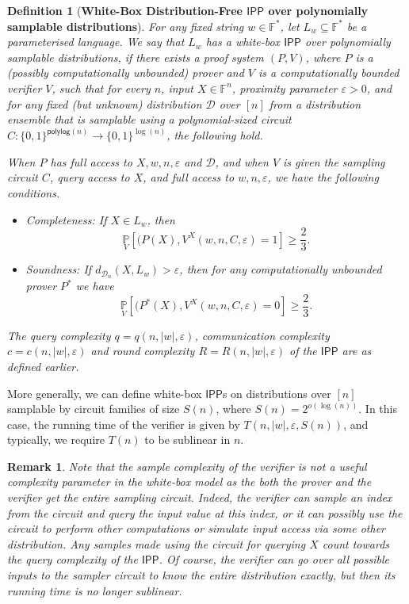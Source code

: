 \documentclass[11pt]{article}
\newtheorem{definition}{Definition}[section]
\newtheorem{remark}{Remark}
\newcommand{\polylog}{\mathsf{polylog}}
\newcommand{\IPP}{\mathsf{IPP}}
\newcommand{\F}{\mathbb{F}}
\newcommand{\sD}{\mathcal{D}}
\begin{document}
\begin{definition}[\textbf{White-Box Distribution-Free $\IPP$ over polynomially samplable distributions}]
\label{def:whitebox_df_ipp}
For any fixed string $w \in \F^*$, let $L_w \subseteq \F^*$ be a parameterised language. We say that $L_w$ has a white-box $\IPP$ over polynomially samplable distributions, if there exists a proof system $(P,V)$, where $P$ is a (possibly computationally unbounded) prover and $V$ is a computationally bounded verifier $V$, such that for every $n$, input $X \in \F^n$, proximity parameter $\varepsilon > 0$, and for any fixed (but unknown) distribution $\sD$ over $[n]$ from a distribution ensemble that is samplable using a polynomial-sized circuit $C : \{0,1\}^{\polylog(n)} \rightarrow \{0,1\}^{\log (n)}$, the following hold. 

When $P$ has full access to $X,w,n,\varepsilon$ and $\sD$, and when $V$ is given the sampling circuit $C$, query access to $X$, and full access to $w,n,\varepsilon$, we have the following conditions.
\begin{itemize}
   \item Completeness: If $X \in L_w$, then
    \begin{equation*}
        \underset{V}{\mathbb{P}}\left[(P(X),V^{X}(w,n,C,\varepsilon) = 1 \right] \geq \frac{2}{3}.
    \end{equation*}
    
    \item Soundness: If $d_{\sD_n} (X, L_w)>\varepsilon$, then for any computationally unbounded prover $P^{\ast}$ we have 
    \begin{equation*}
        \underset{V}{\mathbb{P}} \left[(P^{\ast}(X),V^{X}(w,n,C,\varepsilon)=0 \right]\geq \frac{2}{3}.
    \end{equation*}    
\end{itemize}

The query complexity $q = q(n, \vert w \vert, \varepsilon)$, communication complexity $c = c(n, \vert w \vert, \varepsilon)$ and round complexity $R = R(n, \vert w \vert, \varepsilon)$ of the $\IPP$ are as defined earlier. 
\end{definition}
More generally, we can define white-box $\IPP$s on distributions over $[n]$ samplable by circuit families of size $S(n)$, where $S(n) = 2^{o(\log (n))}$. In this case, the running time of the verifier is given by $T(n, \vert w \vert, \varepsilon, S(n))$, and typically, we require $T(n)$ to be sublinear in $n$.

\begin{remark}
Note that the sample complexity of the verifier is not a useful complexity parameter in the white-box model as the both the prover and the verifier get the entire sampling circuit.  Indeed, the verifier can sample an index from the circuit and query the input value at this index, or it can possibly use the circuit to perform other computations or simulate input access via some other distribution. Any samples made using the circuit for querying $X$ count towards the query complexity of the $\IPP$. Of course, the verifier can go over all possible inputs to the sampler circuit to know the entire distribution exactly, but then its running time is no longer sublinear. 
\end{remark}
\end{document}
